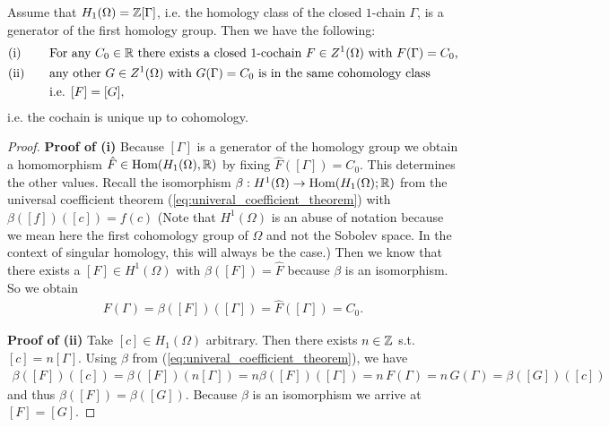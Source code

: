 \documentclass[../master_thesis.tex]{subfiles}
\begin{document}
\begin{proposition}\label{prop:uniqueness_cochain}
    Assume that $H_1(\Omega) = \mathbb{Z} [\Gamma]$, i.e. the homology 
    class of the 
    closed $1$-chain $\Gamma$, is a generator of the first homology group.
    Then we have the following:
\begin{alignat*}{2}
    &\text{\normalfont{(i)}} \quad&&\text{For any $C_0 \in \mathbb{R}$ there exists a closed $1$-cochain 
        $F \in Z^1(\Omega)$ with $F(\Gamma) = C_0$,}
    \\ & \text{\normalfont{(ii)}} \quad&&\text{any other $G \in Z^1(\Omega)$ with $G(\Gamma) = C_0$ 
        is in the same cohomology class}
    \\ & &&\text{i.e. $[F] = [G]$},
\end{alignat*}    
i.e. the cochain is unique up to cohomology.
\end{proposition}
\begin{proof}
    \textbf{Proof of (i)} %
    Because $[\Gamma]$ is a generator of the homology group we  obtain a 
    homomorphism $\hat{F} \in \text{Hom}(H_1(\Omega),\mathbb{R})$ by fixing
    $\hat{F}([\Gamma]) = C_0$. 
    This determines the other values.
    Recall the isomorphism $\beta : H^1(\Omega) \rightarrow 
    \text{Hom}(H_1(\Omega);\mathbb{R})$ from the universal coefficient theorem 
    (\ref{eq:univeral_coefficient_theorem}) with 
    $\beta([f])([c]) = f(c)$
    (Note that $H^1(\Omega)$ is an abuse of notation 
    because we mean here the first cohomology group of $\Omega$ and not the 
    Sobolev space. In the context of singular homology, this will always be the
    case.)
    Then we know that there exists
    a $[F] \in H^1(\Omega)$ with $\beta([F]) = \hat{F}$ because $\beta$ is an
    isomorphism. So we obtain
    \begin{align*}
        F(\Gamma) = \beta([F])([\Gamma]) = \hat{F}([\Gamma]) = C_0.
    \end{align*}

    \textbf{Proof of (ii)} %
    Take $[c] \in H_1(\Omega)$ arbitrary. 
    Then there exists  $n \in \mathbb{Z}$ s.t.
    $[c] = n [\Gamma]$.
    Using $\beta$ from (\ref{eq:univeral_coefficient_theorem}),
    we have
    \begin{align*}
        \beta([F])([c]) = \beta([F])(n [\Gamma]) 
        = n \beta([F])([\Gamma]) = n \, F(\Gamma) = n \, G(\Gamma) = 
        \beta([G])([c])
    \end{align*}
    and thus $\beta([F]) = \beta([G])$. Because $\beta$ is an isomorphism
    we arrive at $[F] = [G]$.
\end{proof}
\end{document}
